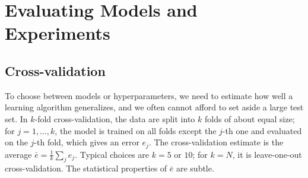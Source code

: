 \section{Evaluating Models and Experiments}\label{L4-sec:evaluation}

\subsection{Cross-validation}

To choose between models or hyperparameters, we need to estimate how well a learning algorithm generalizes, and we often cannot afford to set aside a large test set. In $k$-fold cross-validation, the data are split into $k$ folds of about equal size; for $j = 1, \ldots, k$, the model is trained on all folds except the $j$-th one and evaluated on the $j$-th fold, which gives an error $e_j$. The cross-validation estimate is the average $\bar e = \frac{1}{k}\sum_j e_j$. Typical choices are $k = 5$ or $10$; for $k = N$, it is leave-one-out cross-validation. The statistical properties of $\bar e$ are subtle.
